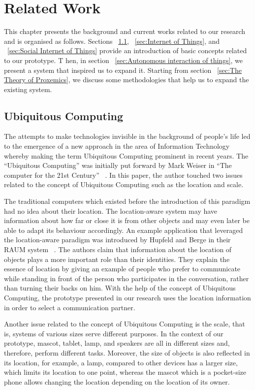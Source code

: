 \chapter{Related Work}
\label{ch:related-work}
This chapter presents the background and current works related to our research and is organised as follows.
Sections ~\ref{sec:Ubiquitous Computing}, ~\ref{sec:Internet of Things}, and ~\ref{sec:Social Internet of Things}
provide an introduction of basic concepts related to our prototype. T
hen, in section ~\ref{sec:Autonomous interaction of things}, we present a system that inspired us to expand it.
Starting from section ~\ref{sec:The Theory of Proxemics}, we discuss some methodologies
that help us to expand the existing system.

\section{Ubiquitous Computing}
\label{sec:Ubiquitous Computing}
The attempts to make technologies invisible in the background of people’s life led to the emergence
of a new approach in the area of Information Technology whereby making the term
Ubiquitous Computing prominent in recent years.
The “Ubiquitous Computing” was initially put forward by Mark Weiser
in “The computer for the 21st Century” ~\cite{weiser2002computer}.
In this paper, the author touched two issues related to the concept of
Ubiquitous Computing such as the location and scale.

\par The traditional computers which existed before the introduction of this
paradigm had no idea about their location.
The location-aware system may have information about how far or close it is from other
objects and may even later be able to adapt its behaviour accordingly.
An example application that leveraged the location-aware paradigm was introduced by
Hupfeld and Berge in their RAUM system ~\cite{hupfeld2000spatially}.
The authors claim that information about the location of objects plays
a more important role than their identities.
They explain the essence of location by giving an example of people who prefer to communicate
while standing in front of the person who participates in the conversation, rather than turning their backs on him.
With the help of the concept of Ubiquitous Computing, the prototype presented in our
research uses the location information in order to select a communication partner.

\par Another issue related to the concept of Ubiquitous Computing is the scale,
that is, systems of various sizes serve different purposes.
In the context of our prototype, mascot, tablet, lamp, and speakers are all in
different sizes and, therefore, perform different tasks.
Moreover, the size of objects is also reflected in its location, for example, a lamp, compared
to other devices has a larger size, which limits its location to one point, whereas the mascot
which is a pocket-size phone allows changing the location depending on the location of its owner.

